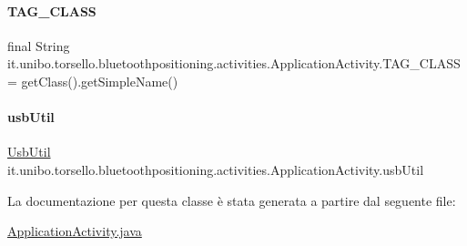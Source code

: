 \paragraph{\texorpdfstring{T\+A\+G\+\_\+\+C\+L\+A\+SS}{TAG\_CLASS}}
{\footnotesize\ttfamily final String it.\+unibo.\+torsello.\+bluetoothpositioning.\+activities.\+Application\+Activity.\+T\+A\+G\+\_\+\+C\+L\+A\+SS = get\+Class().get\+Simple\+Name()\hspace{0.3cm}{\ttfamily [private]}}

\hypertarget{classit_1_1unibo_1_1torsello_1_1bluetoothpositioning_1_1activities_1_1ApplicationActivity_abe62157d98c81406ae3d79dbc0fd9093_abe62157d98c81406ae3d79dbc0fd9093}{}\label{classit_1_1unibo_1_1torsello_1_1bluetoothpositioning_1_1activities_1_1ApplicationActivity_abe62157d98c81406ae3d79dbc0fd9093_abe62157d98c81406ae3d79dbc0fd9093} 
\paragraph{\texorpdfstring{usb\+Util}{usbUtil}}
{\footnotesize\ttfamily \hyperlink{classit_1_1unibo_1_1torsello_1_1bluetoothpositioning_1_1util_1_1UsbUtil}{Usb\+Util} it.\+unibo.\+torsello.\+bluetoothpositioning.\+activities.\+Application\+Activity.\+usb\+Util\hspace{0.3cm}{\ttfamily [private]}}



La documentazione per questa classe è stata generata a partire dal seguente file\+:\begin{DoxyCompactItemize}
\item 
\hyperlink{ApplicationActivity_8java}{Application\+Activity.\+java}\end{DoxyCompactItemize}
